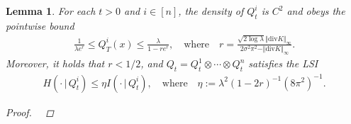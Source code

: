 \documentclass[11pt,reqno]{amsart}
\numberwithin{equation}{section}
\newtheorem{lemma}[theorem]{Lemma}
\theoremstyle{definition}
\def\diver{\mathrm{div}}
\begin{document}
\begin{lemma} \label{lem.torus.prep}
	For each $t > 0$ and $i \in [n]$, the density of $Q^i_t$ is  $C^2$ and obeys the pointwise bound
	\begin{align*}
		\frac{1}{\lambda e^{r}} \le Q^{i}_T(x)  \le \frac{\lambda}{1 - r e^{r}}, \quad \text{where} \quad 	r 		 =   \frac{\sqrt{2 \log \lambda} \Vert \diver K \Vert_\infty}{ 2\sigma^2\pi^2 -  \Vert \diver K \Vert_\infty } .
	\end{align*}
	Moreover, it holds that $r < 1/2$, and $Q_t=Q^1_t\otimes \cdots \otimes Q^n_t$ satisfies the LSI
	\begin{align}
		H(\cdot \,|\, Q^i_t) \le \eta I(\cdot \,|\, Q^i_t), \quad \text{where} \quad \eta := \lambda^2(1 - 2r)^{-1}(8\pi^2)^{-1}.
	\end{align}
	\begin{proof}
	 { \ }
	 

\end{proof}
\end{lemma}
\end{document}
